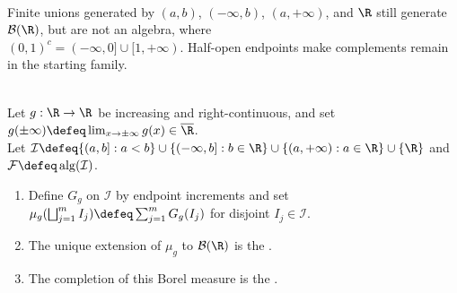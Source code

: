 \begin{remark} \label{rem:half-open-endpoints-make-an-algebra} \\
Finite unions generated by $(a,b)$, $(-\infty,b)$, $(a,+\infty)$, and $\R$ still generate $\mathcal{B}(\R)$, but are not an algebra, where\\
$(0,1)^c=(-\infty,0]\cup[1,+\infty)$. Half-open endpoints make complements remain in the starting family.
\end{remark}

\begin{definition} \label{def:borel-lebesgue-stieltjes-measures} \\
Let $g:\R\to\R$ be increasing and right-continuous, and set $g(\pm\infty)\defeq\lim_{x\to\pm\infty}g(x)\in\overline{\R}$.\\
Let $\mathcal{I}\defeq\{(a,b]:a<b\}\cup\{(-\infty,b]:b\in\R\}\cup\{(a,+\infty):a\in\R\}\cup\{\R\}$ and $\mathcal{F}\defeq\operatorname{alg}(\mathcal{I})$.
\begin{enumerate}[label=(\roman*)]
\setlength{\itemsep}{0pt}
\item Define $G_g$ on $\mathcal{I}$ by endpoint increments and set $\mu_g(\bigsqcup_{j=1}^{m}I_j)\defeq\sum_{j=1}^{m}G_g(I_j)$ for disjoint $I_j\in\mathcal{I}$.
\item The unique extension of $\mu_g$ to $\mathcal{B}(\R)$ is the .
\item The completion of this Borel measure is the .
\end{enumerate}
\end{definition}


